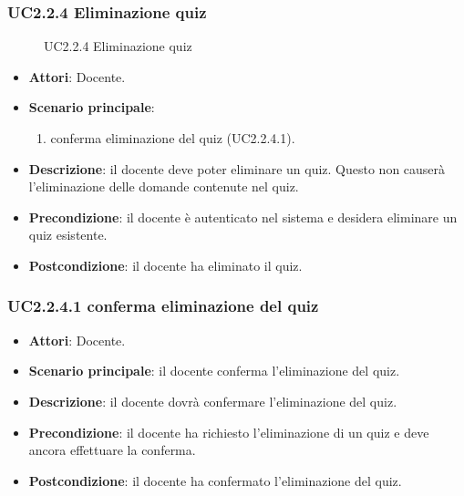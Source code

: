 \subsubsection{UC2.2.4 Eliminazione quiz}
\begin{figure}[H]
\centering
\noindent{}
\caption{UC2.2.4 Eliminazione quiz}
\end{figure}
\begin{itemize}
\item \textbf{Attori}: Docente.
\item \textbf{Scenario principale}:
\begin{enumerate}
\item conferma eliminazione del quiz (UC2.2.4.1).
\end{enumerate}
\item \textbf{Descrizione}: il docente deve poter eliminare un quiz. Questo non causerà l’eliminazione delle domande contenute nel quiz.
\item \textbf{Precondizione}: il docente è autenticato nel sistema e desidera eliminare un quiz esistente.
\item \textbf{Postcondizione}: il docente ha eliminato il quiz.
\end{itemize}
\subsubsection{UC2.2.4.1 conferma eliminazione del quiz}
\begin{itemize}
\item \textbf{Attori}: Docente.
\item \textbf{Scenario principale}: il docente conferma l'eliminazione del quiz.
\item \textbf{Descrizione}: il docente dovrà confermare l'eliminazione del quiz.
\item \textbf{Precondizione}: il docente ha richiesto l'eliminazione di un quiz e deve ancora effettuare la conferma.
\item \textbf{Postcondizione}: il docente ha confermato l'eliminazione del quiz.
\end{itemize}

